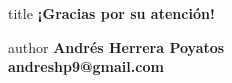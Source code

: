 \documentclass[10pt,compress]{beamer}
\makeatletter
\newcommand{\docauthor}{Andrés Herrera Poyatos}
\newcommand{\docemail}{\textbf{{\color{TurkishRose}andreshp9@gmail.com}}}
\makeatother
\begin{document}
{ 
  \begin{frame}[plain]
    \vspace{0.1\paperheight}
    \begin{titleBox}
      \begin{beamercolorbox}[sep=8pt,center]{title}
        \textbf{¡Gracias por su atención!}
      \end{beamercolorbox}

	\begin{beamercolorbox}[sep=8pt,center]{author}	
          \large\textbf{\docauthor} \\
          \large\docemail
        \end{beamercolorbox}
      \end{titleBox}
    \end{frame}
  }
\end{document}
